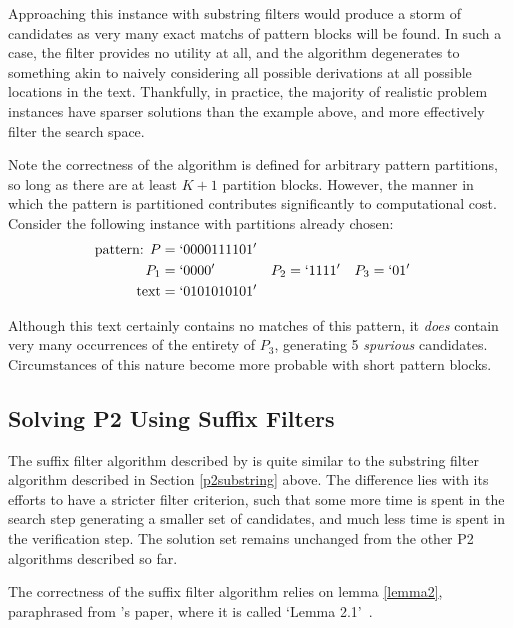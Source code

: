 Approaching this instance with substring filters would produce a storm of candidates as very many \glspl{exact match} of pattern blocks will be found. In such a case, the filter provides no utility at all, and the algorithm degenerates to something akin to naively considering all possible derivations at all possible locations in the text. Thankfully, in practice, the majority of realistic problem instances have sparser solutions than the example above, and more effectively filter the search space.
 
Note the correctness of the algorithm is defined for arbitrary pattern partitions, so long as there are at least $K+1$ partition blocks. However, the manner in which the pattern is partitioned contributes significantly to computational cost. Consider the following instance with partitions already chosen:
\begin{align*}
\text{pattern:  } P &= `0000111101'\\
P_1 &= `0000' & P_2 &= `1111' & P_3 &= `01'\\
\text{text} &= `0101010101'
\end{align*}

Although this text certainly contains no matches of this pattern, it \textit{does} contain very many occurrences of the entirety of $P_3$, generating 5 \textit{spurious} candidates. Circumstances of this nature become more probable with short pattern blocks.







\subsection{Solving P2 Using Suffix Filters}
\label{P2suffix}

The \gls{suffix filter} algorithm described by \kark{} is quite similar to the \gls{substring filter} algorithm described in Section \ref{p2substring} above. The difference lies with its efforts to have a stricter \gls{filter criterion}, such that some more time is spent in the \gls{search step} generating a smaller set of \glspl{candidate}, and much less time is spent in the \gls{verification step}. The \gls{solution} set remains unchanged from the other P2 algorithms described so far.
 
The correctness of the suffix filter algorithm relies on lemma \ref{lemma2}, paraphrased from \kark{}'s paper, where it is called `Lemma 2.1'~\cite{kark2007}.


